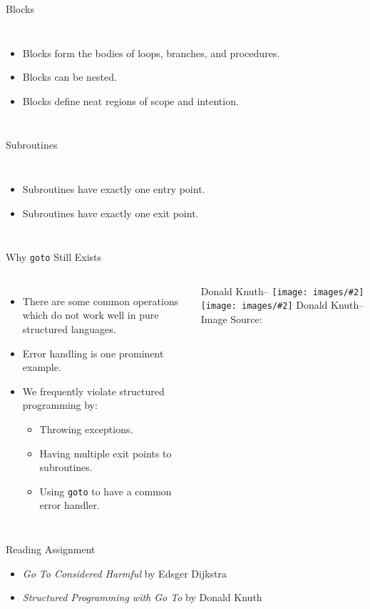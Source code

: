 \documentclass[handout]{beamer}
\makeatletter
\newcommand{\image}[3][\@nil]{%
        \def\tmp{#1}%
        \begin{center}
        \ifx\tmp\@nnil
            \texttt{[image: images/\#2]}
        \else
            \texttt{[image: images/\#2]}
            \linebreak
            #1
        \fi
        \linebreak
        {\tiny Image Source:\thinspace{\tiny #3}}
        \end{center}
}
\newenvironment{code}{%
 \VerbatimEnvironment
 \begin{adjustbox}{max width=\textwidth, max height=0.7\textheight}
 \begin{BVerbatim}
  }{
  \end{BVerbatim}
 \end{adjustbox}
}
\makeatother
\begin{document}
\begin{frame}[fragile]{Blocks}
\begin{columns}
\begin{itemize}
    \item Blocks form the bodies of loops, branches, and procedures.
    \item Blocks can be nested.
    \item Blocks define neat regions of scope and intention.
\end{itemize}
\end{columns}
\end{frame}


\begin{frame}[fragile]{Subroutines}
\begin{columns}
\begin{itemize}
    \item Subroutines have exactly one entry point.
    \item Subroutines have exactly one exit point.
\end{itemize}
\end{columns}
\end{frame}


\begin{frame}{Why \texttt{goto} Still Exists}
\begin{columns}
\begin{itemize}
    \item There are some common operations which do not work well in pure structured languages.
    \item Error handling is one prominent example.
    \item We frequently violate structured programming by:
    \begin{itemize}
        \item Throwing exceptions.
        \item Having multiple exit points to subroutines.
        \item Using \texttt{goto} to have a common error handler.
    \end{itemize}
\end{itemize}
\image[Donald Knuth--]{knuth}{Wikipedia}
\end{columns}
\end{frame}

\begin{frame}{Reading Assignment}
    \begin{itemize}
        \item \textit{Go To Considered Harmful} by Edsger Dijkstra
        \item \textit{Structured Programming with Go To} by Donald Knuth
    \end{itemize}
\end{frame}
\end{document}
